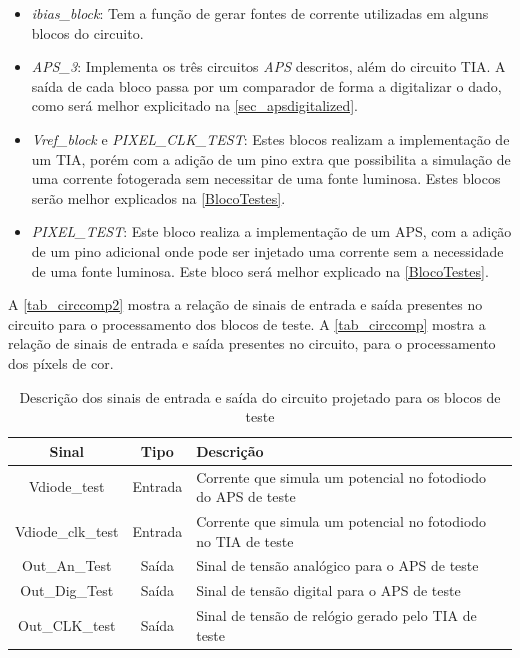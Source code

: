 \begin{itemize}
    \item \textit{ibias\_block}: Tem a função de gerar fontes de corrente utilizadas em alguns blocos do circuito.
    
    \item \textit{APS\_3}: Implementa os tr\^es circuitos \textit{APS} descritos, al\'em do circuito TIA. A sa\'ida de cada bloco passa por um comparador de forma a digitalizar o dado, como ser\'a melhor explicitado na \autoref{sec_apsdigitalized}.
    
    \item \textit{Vref\_block} e \textit{PIXEL\_CLK\_TEST}: Estes blocos realizam a implementação de um TIA, por\'em com a adição de um pino extra que possibilita a simulação de uma corrente fotogerada sem necessitar de uma fonte luminosa. Estes blocos serão melhor explicados na \autoref{BlocoTestes}. 
    
    \item \textit{PIXEL\_TEST}: Este bloco realiza a implementação de um APS, com a adição de um pino adicional onde pode ser injetado uma corrente sem a necessidade de uma fonte luminosa. Este bloco será melhor explicado na \autoref{BlocoTestes}.
    
\end{itemize}

A \autoref{tab_circcomp2} mostra a relação de sinais de entrada e sa\'ida presentes no circuito para o processamento dos blocos de teste. A \autoref{tab_circcomp} mostra a relação de sinais de entrada e sa\'ida presentes no circuito, para o processamento dos p\'ixels de cor.

\begin{table}[ht]
  \caption{Descrição dos sinais de entrada e sa\'ida do circuito projetado para os blocos de teste}%
  \label{tab_circcomp2}
  \begin{tabular}{ccl}
  \toprule
   Sinal & Tipo & Descrição \\
   \midrule \midrule
   Vdiode\_test & Entrada & Corrente que simula um potencial no fotodiodo do APS de teste\\
   \midrule
   Vdiode\_clk\_test & Entrada & Corrente que simula um potencial no fotodiodo no TIA de teste\\
   \midrule
   Out\_An\_Test & Sa\'ida & Sinal de tensão anal\'ogico para o APS de teste \\
   \midrule
   Out\_Dig\_Test & Sa\'ida & Sinal de tensão digital para o APS de teste \\
  \midrule
   Out\_CLK\_test & Sa\'ida & Sinal de tensão de rel\'ogio gerado pelo TIA de teste\\
  \bottomrule
\end{tabular}%
\end{table}

